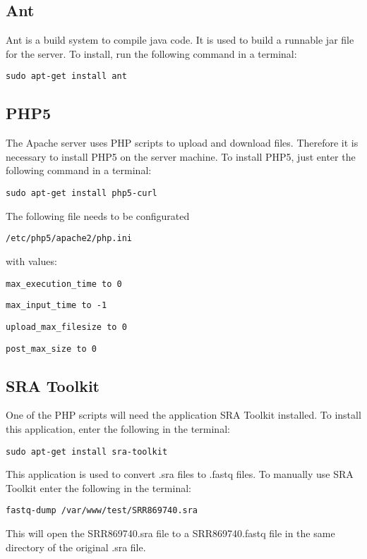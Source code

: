\subsection{Ant}
Ant is a build system to compile java code. It is used to build a runnable jar file for the server.
To install, run the following command in a terminal:
\begin{verbatim}sudo apt-get install ant\end{verbatim}
\subsection{PHP5}
The Apache server uses PHP scripts to upload and download files. Therefore it is necessary to install PHP5 on the server machine. To install PHP5, just enter the following command in a terminal:
\begin{verbatim}sudo apt-get install php5-curl\end{verbatim}

The following file needs to be configurated \begin{verbatim}/etc/php5/apache2/php.ini\end{verbatim} with values:

\begin{verbatim}max_execution_time to 0\end{verbatim}
\begin{verbatim}max_input_time to -1\end{verbatim}
\begin{verbatim}upload_max_filesize to 0\end{verbatim}
\begin{verbatim}post_max_size to 0\end{verbatim}

\subsection{SRA Toolkit}
One of the PHP scripts will need the application SRA Toolkit installed. To install this application, enter the following in the terminal:
\begin{verbatim}sudo apt-get install sra-toolkit\end{verbatim}
This application is used to convert .sra files to .fastq files. To manually use SRA Toolkit enter the following in the terminal:
\begin{verbatim}fastq-dump /var/www/test/SRR869740.sra\end{verbatim}
This will open the SRR869740.sra file to a SRR869740.fastq file in the same directory of the original .sra file.





















